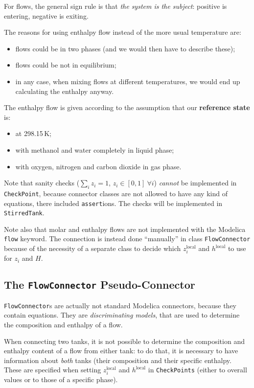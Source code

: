 \documentclass[a4paper]{article}
\begin{document}
For flows, the general sign rule is that \emph{the system is the subject}:
positive is entering, negative is exiting.

The reasons for using enthalpy flow instead of the more usual temperature are:

\begin{itemize}
\item flows could be in two phases (and we would then have to describe these);
\item flows could be not in equilibrium;
\item in any case, when mixing flows at different temperatures, we would end up
calculating the enthalpy anyway.
\end{itemize}

The enthalpy flow is given according to the assumption that our
\textbf{reference state} is:

\begin{itemize}
\item at 298.15\,K;
\item with methanol and water completely in liquid phase;
\item with oxygen, nitrogen and carbon dioxide in gas phase.
\end{itemize}

Note that sanity checks ($\sum_i z_i = 1$, $z_i \in [0,1] ~ \forall i$)
\emph{cannot} be implemented in \texttt{CheckPoint}, because connector classes
are not allowed to have any kind of equations, there included
\texttt{assert}ions. The checks will be implemented in \texttt{StirredTank}.

Note also that molar and enthalpy flows are not implemented with the Modelica
\texttt{flow} keyword. The connection is instead done ``manually'' in class
\texttt{FlowConnector} because of the necessity of a separate class to decide
which $z^\text{local}_i$ and $h^\text{local}$ to use for $z_i$ and $H$.


\subsection{The \texttt{FlowConnector} Pseudo-Connector}
\texttt{FlowConnector}s are actually not standard Modelica connectors, because
they contain equations. They are \emph{discriminating models}, that are used to
determine the composition and enthalpy of a flow.

When connecting two tanks, it is not possible to determine the composition and
enthalpy content of a flow from either tank: to do that, it is necessary to have
information about \emph{both} tanks (their composition and their specific
enthalpy. These are specified when setting $z^\text{local}_i$ and
$h^\text{local}$ in \texttt{CheckPoints} (either to overall values or to those
of a specific phase).
\end{document}

